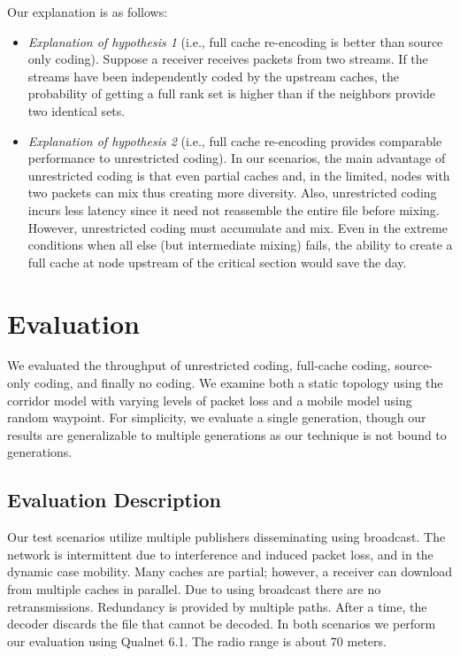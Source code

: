 Our explanation is as follows:

\begin{itemize}

\item \emph{Explanation of hypothesis 1} (i.e.,  full cache re-encoding is better than source only coding). Suppose a receiver receives packets from two streams. If the streams have been independently coded by the upstream caches, the probability of getting a full rank set is higher than if the neighbors provide two identical sets.

\item \emph{Explanation of hypothesis 2} (i.e., full cache re-encoding provides comparable performance to unrestricted coding). In our scenarios, the main advantage of unrestricted coding is that even partial caches and, in the limited, nodes with two packets can mix thus creating more diversity. Also, unrestricted coding incurs less latency since it need not reassemble the entire file before mixing. However, unrestricted coding must accumulate and mix. Even in the extreme conditions when all else (but intermediate mixing) fails, the ability to create a full cache at node upstream of the critical section would save the day.
\end{itemize}

\section{Evaluation}
We evaluated the throughput of unrestricted coding, full-cache coding, source-only coding, and finally no coding. We examine both a static topology using the corridor model \cite{Oh:2009:RMR:1702135.1702167} with varying levels of packet loss and a mobile model using random waypoint. For simplicity, we evaluate a single generation, though our results are generalizable to multiple generations as our technique is not bound to generations.


\subsection{Evaluation Description}
Our test scenarios utilize multiple publishers disseminating using broadcast. The network is intermittent due to interference and induced packet loss, and in the dynamic case mobility. Many caches are partial; however, a receiver can download from multiple caches in parallel. Due to using broadcast there are no retransmissions. Redundancy is provided by multiple paths. After a time, the decoder discards the file that cannot be decoded. In both scenarios we perform our evaluation using Qualnet 6.1. The radio range is about 70 meters.

